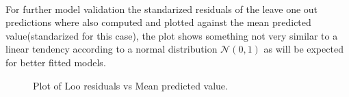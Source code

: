 \paragraph{}
For further model validation the standarized residuals of the leave one out predictions where also computed and plotted against the mean predicted value(standarized for this case), the plot shows something not very similar to a linear tendency according to a normal distribution $\mathcal{N}(0,1)$ as will be expected for better fitted models.

\begin{figure}[h]
	\centering
	
	\caption{Plot of Loo residuals vs Mean predicted value.}
	\label{mlooresiduals_vs_real}
\end{figure}
